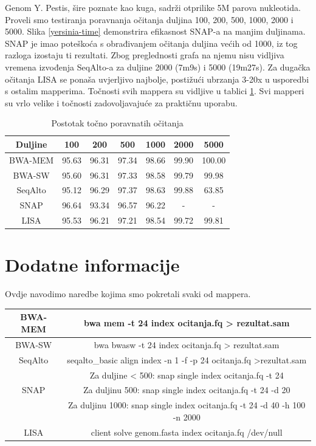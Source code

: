 \documentclass[times, utf8, diplomski]{fer}
\begin{document}
Genom Y. Pestis, šire poznate kao kuga, sadrži otprilike 5M parova nukleotida. Proveli smo testiranja poravnanja očitanja duljina 100, 200, 500, 1000, 2000 i 5000. Slika \ref{yersinia-time} demonstrira efikasnost SNAP-a na manjim duljinama. SNAP je imao poteškoća s obrađivanjem očitanja duljina većih od 1000, iz tog razloga izostaju ti rezultati. Zbog preglednosti grafa na njemu nisu vidljiva vremena izvođenja SeqAlto-a za duljine 2000 (7m9s) i 5000 (19m27s). Za dugačka očitanja LISA se ponaša uvjerljivo najbolje, postižući ubrzanja 3-20x u usporedbi s ostalim mapperima. Točnosti svih mappera su vidljive u tablici \ref{yersinia-correct}. Svi mapperi su vrlo velike i točnosti zadovoljavajuće za praktičnu uporabu.

\begin{table}[H]
\centering
\begin{tabular}{|c||c|c|c|c|c|c|}
\hline
	Duljine & 100 & 200 & 500 & 1000 & 2000 & 5000\\
\hline
\hline
	BWA-MEM & 95.63 & 96.31 & 97.34 & 98.66 & 99.90 & 100.00\\
\hline
	BWA-SW  & 95.60 & 96.31 & 97.33 & 98.58 & 99.79 & 99.98\\
\hline
	SeqAlto & 95.12 & 96.29 & 97.37 & 98.63 & 99.88 & 63.85\\
\hline
	SNAP    & 96.64 & 93.34 & 96.57 & 96.22 & - & -\\
\hline
	LISA    & 95.53 & 96.21 & 97.21 & 98.54 & 99.72 & 99.81\\
\hline
\end{tabular}
\caption{Postotak točno poravnatih očitanja}\label{yersinia-correct}
\end{table}


\section {Dodatne informacije}
Ovdje navodimo naredbe kojima smo pokretali svaki od mappera.

\begin{table}[H]
\centering
\begin{tabular}{|c|c|}
\hline
BWA-MEM & bwa mem -t 24 index ocitanja.fq > rezultat.sam\\
\hline
BWA-SW & bwa bwasw -t 24 index ocitanja.fq > rezultat.sam\\
\hline
SeqAlto & seqalto\_basic align index -n 1 -f -p 24 ocitanja.fq >rezultat.sam\\
\hline
 & Za duljine < 500: snap single index ocitanja.fq -t 24\\
SNAP & Za duljinu 500: snap single index ocitanja.fq -t 24 -d 20\\
& Za duljinu 1000: snap single index ocitanja.fq -t 24 -d 40 -h 100 -n 2000\\
\hline
LISA & client solve genom.fasta index ocitanja.fq /dev/null\\
\hline
\end{tabular}
\label{komande}
\end{table}
\end{document}
